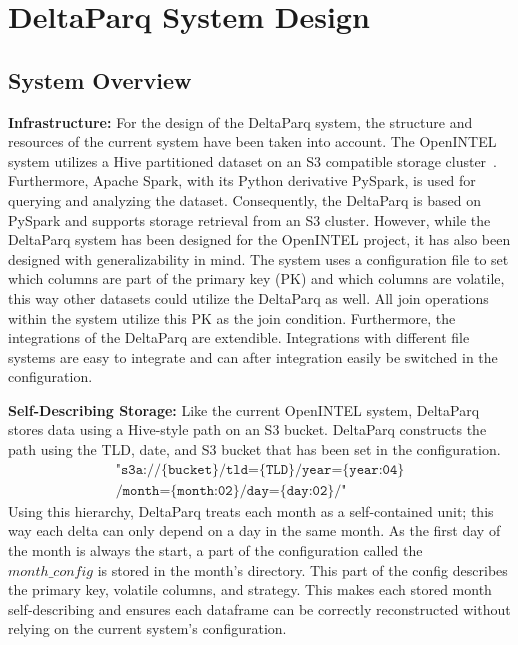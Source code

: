 \section{DeltaParq System Design}

\subsection{System Overview}

\hspace{\parindent}\textbf{Infrastructure:} For the design of the DeltaParq system, the structure and resources 
of the current system have been taken into account. The OpenINTEL system 
utilizes a Hive partitioned dataset on an S3 compatible storage cluster~\cite{7460220}.
Furthermore, Apache Spark, with its Python derivative PySpark, is used for 
querying and analyzing the dataset. Consequently, the DeltaParq is based on PySpark 
and supports storage retrieval from an S3 cluster. However, while the DeltaParq system 
has been designed for the OpenINTEL project, it has also been designed with 
generalizability in mind. The system uses a configuration file to set 
which columns are part of the primary key (PK) and which columns are volatile, 
this way other datasets could utilize the DeltaParq as well. All join operations 
within the system utilize this PK as the join condition. Furthermore, 
the integrations of the DeltaParq are extendible. Integrations with different 
file systems are easy to integrate and can after integration easily be switched 
in the configuration.


\textbf{Self-Describing Storage:} Like the current OpenINTEL system, DeltaParq stores data using a Hive-style path on an S3 
bucket. DeltaParq constructs the path using the TLD, date, and S3 bucket that has been set 
in the configuration.
\[
\begin{gathered}
    \texttt{"s3a://\{bucket\}/tld=\{TLD\}/year=\{year:04\}}\\
    \texttt{/month=\{month:02\}/day=\{day:02\}/"}
\end{gathered}
\]
Using this hierarchy, DeltaParq treats each month as a self-contained unit; this way each delta 
can only depend on a day in the same month. As the first day of the month is always the start, a 
part of the configuration called the $month\_config$ is stored in the month's directory. This part of  
the config describes the primary key, volatile columns, and strategy. This makes each stored month 
self-describing and ensures each dataframe can be correctly reconstructed without relying on the 
current system's configuration.


